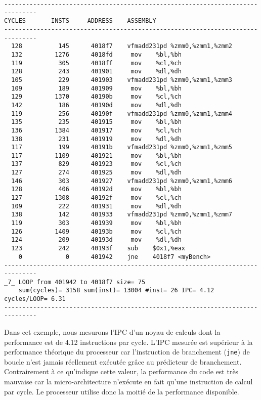 \begin{lstlisting}[label=lst:dev_op_ipc_missleading, caption=Noyau de calcul n'exécutant qu'une opération de calcul par cycle.]
-------------------------------------------------------------------------------
CYCLES       INSTS     ADDRESS    ASSEMBLY                         
-------------------------------------------------------------------------------
  128          145      4018f7    vfmadd231pd %zmm0,%zmm1,%zmm2
  132         1276      4018fd     mov    %bl,%bh
  119          305      4018ff     mov    %cl,%ch
  128          243      401901     mov    %dl,%dh
  105          229      401903    vfmadd231pd %zmm0,%zmm1,%zmm3
  109          189      401909     mov    %bl,%bh
  129         1370      40190b     mov    %cl,%ch
  142          186      40190d     mov    %dl,%dh
  119          256      40190f    vfmadd231pd %zmm0,%zmm1,%zmm4
  135          235      401915     mov    %bl,%bh
  136         1384      401917     mov    %cl,%ch
  138          231      401919     mov    %dl,%dh
  117          199      40191b    vfmadd231pd %zmm0,%zmm1,%zmm5
  117         1109      401921     mov    %bl,%bh
  137          829      401923     mov    %cl,%ch
  127          274      401925     mov    %dl,%dh
  146          303      401927    vfmadd231pd %zmm0,%zmm1,%zmm6
  128          406      40192d     mov    %bl,%bh
  127         1308      40192f     mov    %cl,%ch
  109          222      401931     mov    %dl,%dh
  138          142      401933    vfmadd231pd %zmm0,%zmm1,%zmm7
  119          303      401939     mov    %bl,%bh
  126         1409      40193b     mov    %cl,%ch
  124          209      40193d     mov    %dl,%dh
  123          242      40193f    sub    $0x1,%eax
    0            0      401942    jne    4018f7 <myBench>
-------------------------------------------------------------------------------
_7_ LOOP from 401942 to 4018f7 size= 75 
    sum(cycles)= 3158 sum(inst)= 13004 #inst= 26 IPC= 4.12 cycles/LOOP= 6.31
-------------------------------------------------------------------------------
\end{lstlisting} 
        
        
        Dans cet exemple, nous mesurons l'\gls{IPC} d'un noyau de calculs dont la performance est de 4.12 instructions par cycle. L'IPC mesurée est supérieur à la performance théorique du processeur car l'instruction de branchement (\verb=jne=) de boucle n'est jamais réellement exécutée grâce au prédicteur de branchement. Contrairement à ce qu'indique cette valeur, la performance du code est très mauvaise car la micro-architecture n'exécute en fait qu'une instruction de calcul par cycle. Le processeur utilise donc la moitié de la performance disponible.
    
